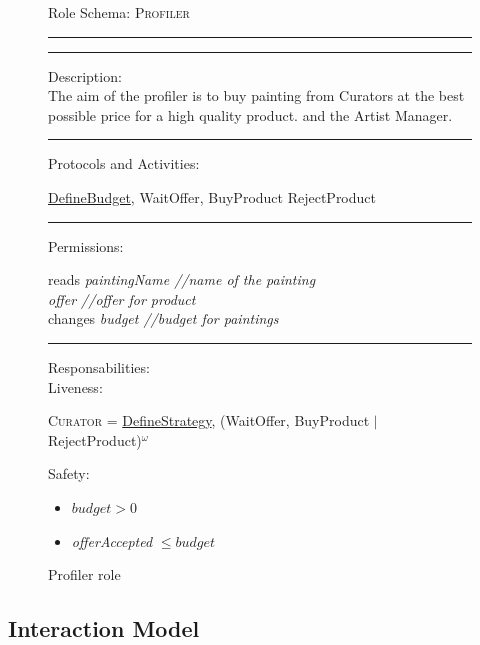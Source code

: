 \documentclass[a4paper,11pt]{report}
\begin{document}
  \begin{figure}[ht!]
    \begin{mdframed}
      Role Schema: \textsc{Profiler} \\ \hrule \vspace{2pt} \hrule \vspace{10pt}
      Description:\\
      The aim of the profiler is to buy painting from Curators at the best possible
      price for a high quality product.
      and the Artist Manager.
      \\ \hrule \vspace{10pt}
      Protocols and Activities:
      \vspace{-10pt}
      \begin{flushleft}
       \underline{DefineBudget}, WaitOffer, BuyProduct
       RejectProduct
      \end{flushleft}
      \hrule \vspace{10pt}
      Permissions:\\
      \vspace{-15pt}
      \begin{center}
       reads \textit{paintingName //name of the painting}\\
	    \textit{offer //offer for product}\\
      changes \textit{budget //budget for paintings}
      \end{center}
      \hrule \vspace{10pt}
      Responsabilities:\\
      Liveness:
      \begin{flushleft}
      \small\textsc{Curator} = \underline{DefineStrategy}, (WaitOffer, BuyProduct $\mid$
      RejectProduct)$^\omega$
      \end{flushleft}
      Safety:
      \begin{itemize}
      \itemsep0pt
      \item $budget > 0$
       \item \textit{offerAccepted} $\leq budget$
      \end{itemize}
    \end{mdframed}
  \caption{Profiler role}
  \label{figure:role_profiler}
  \end{figure}
  
  
  \subsection{Interaction Model}
\end{document}
